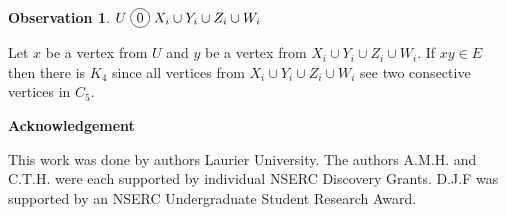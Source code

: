\documentclass[12pt]{article}
\newcommand*\circled[1]{\tikz[baseline=(char.base)]{
            \node[shape=circle,draw,inner sep=2pt] (char) {#1};}}
\newtheorem{Observation}[Theorem]{Observation}
\begin{document}
\begin{Observation}\label{obs:U-co-joins}
$U \;\circled{0}\; X_i \cup Y_i \cup Z_i \cup W_i$
\end{Observation}
 Let $x$ be a vertex from $U$ and $y$ be a vertex from $X_i \cup Y_i \cup Z_i \cup W_i$. If $xy \in E$ then there is $K_4$ since all vertices from $X_i \cup Y_i \cup Z_i \cup W_i$ see two consective vertices in $C_5$.


\begin{center}
{\bf Acknowledgement}
\end{center}
This work was done by authors  Laurier University. The authors A.M.H. and C.T.H. were each supported by individual NSERC Discovery Grants. D.J.F was supported by an NSERC Undergraduate Student Research Award.


\clearpage
\begin{thebibliography}{99}

\end{thebibliography}
\end{document}
